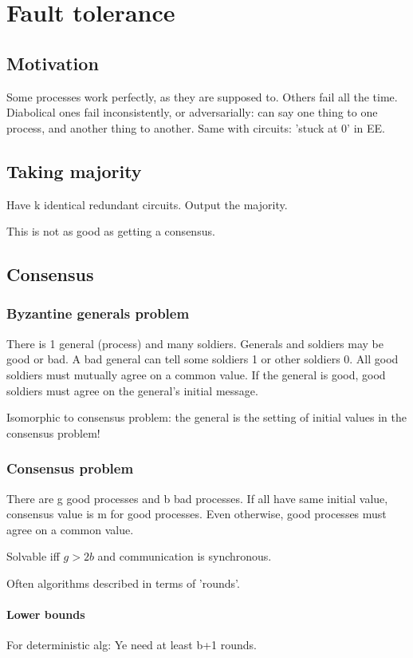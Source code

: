 \documentclass[oneside, article]{memoir}
\begin{document}
\section{Fault tolerance}
\subsection{Motivation}
Some processes work perfectly, as they are supposed to. Others fail all the time. Diabolical ones fail inconsistently, or adversarially: can say one thing to one process, and another thing to another. Same with circuits: 'stuck at 0' in EE.

\subsection{Taking majority}
Have k identical redundant circuits. Output the majority.

This is not as good as getting a consensus. \why

\subsection{Consensus}
\subsubsection{Byzantine generals problem}
There is 1 general (process) and many soldiers. Generals and soldiers may be good or bad. A bad general can tell some soldiers 1 or other soldiers 0. All good soldiers must mutually agree on a common value. If the general is good, good soldiers must agree on the general's initial message.

Isomorphic to consensus problem: the general is the setting of initial values in the consensus problem!

\subsubsection{Consensus problem}
There are g good processes and b bad processes. If all have same initial value, consensus value is m for good processes. Even otherwise, good processes must agree on a common value.

Solvable iff $g > 2b$ and communication is synchronous.

Often algorithms described in terms of 'rounds'.

\paragraph*{Lower bounds}
For deterministic alg: Ye need at least b+1 rounds.
\end{document}
